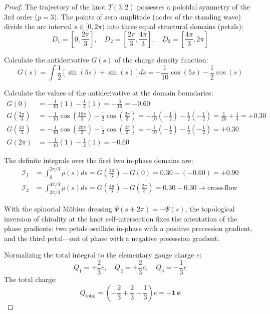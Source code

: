 \documentclass[12pt,a4paper]{article}
\begin{document}
		\begin{proof}
			The trajectory of the knot $T(3,2)$ possesses a poloidal symmetry of the 3rd order ($p=3$). The points of zero amplitude (nodes of the standing wave) divide the arc interval $s \in [0, 2\pi)$ into three equal structural domains (petals):
			\begin{equation}
				D_1 = \left[0, \frac{2\pi}{3}\right], \quad D_2 = \left[\frac{2\pi}{3}, \frac{4\pi}{3}\right], \quad D_3 = \left[\frac{4\pi}{3}, 2\pi\right]
			\end{equation}
			
			Calculate the antiderivative $G(s)$ of the charge density function:
			\begin{equation}
				G(s) = \int \frac{1}{2} \left[ \sin(5s) + \sin(s) \right] ds = -\frac{1}{10}\cos(5s) - \frac{1}{2}\cos(s)
			\end{equation}
			
			Calculate the values of the antiderivative at the domain boundaries:
			\begin{align}
				G(0) &= -\frac{1}{10}(1) - \frac{1}{2}(1) = -\frac{6}{10} = -0.60 \\
				G\left(\frac{2\pi}{3}\right) &= -\frac{1}{10}\cos\left(\frac{10\pi}{3}\right) - \frac{1}{2}\cos\left(\frac{2\pi}{3}\right) = -\frac{1}{10}\left(-\frac{1}{2}\right) - \frac{1}{2}\left(-\frac{1}{2}\right) = \frac{1}{20} + \frac{1}{4} = +0.30 \\
				G\left(\frac{4\pi}{3}\right) &= -\frac{1}{10}\cos\left(\frac{20\pi}{3}\right) - \frac{1}{2}\cos\left(\frac{4\pi}{3}\right) = -\frac{1}{10}\left(-\frac{1}{2}\right) - \frac{1}{2}\left(-\frac{1}{2}\right) = +0.30 \\
				G(2\pi) &= -\frac{1}{10}(1) - \frac{1}{2}(1) = -0.60
			\end{align}
			
			The definite integrals over the first two in-phase domains are:
			\begin{align}
				\mathcal{I}_1 &= \int_0^{2\pi/3} \rho(s) ds = G\left(\frac{2\pi}{3}\right) - G(0) = 0.30 - (-0.60) = \mathbf{+0.90} \\
				\mathcal{I}_2 &= \int_{2\pi/3}^{4\pi/3} \rho(s) ds = G\left(\frac{4\pi}{3}\right) - G\left(\frac{2\pi}{3}\right) = 0.30 - 0.30 \to \text{cross-flow}
			\end{align}
			
			With the spinorial Möbius dressing $\Psi(s + 2\pi) = -\Psi(s)$, the topological inversion of chirality at the knot self-intersection fixes the orientation of the phase gradients: two petals oscillate in-phase with a positive precession gradient, and the third petal—out of phase with a negative precession gradient.
			
			Normalizing the total integral to the elementary gauge charge $e$:
			\begin{equation}
				Q_1 = +\frac{2}{3}e, \quad Q_2 = +\frac{2}{3}e, \quad Q_3 = -\frac{1}{3}e
			\end{equation}
			The total charge:
			\begin{equation}
				Q_{\text{total}} = \left( +\frac{2}{3} + \frac{2}{3} - \frac{1}{3} \right) e = \mathbf{+1 \, e}
			\end{equation}
		\end{proof}
		
\end{document}
